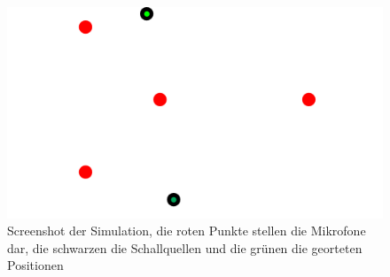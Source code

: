 \begin{figure}[H]
	\centering
  \includegraphics[width=(0.7\linewidth)]{img/bildsimulation}
  \caption{Screenshot der Simulation, die roten Punkte stellen die Mikrofone dar, die schwarzen die Schallquellen und die grünen die georteten Positionen}
\end{figure}

